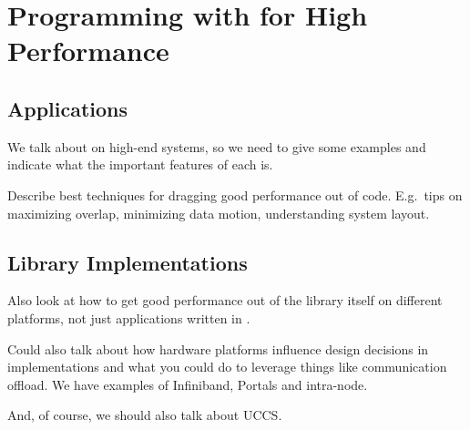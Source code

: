 %
% 
% 
% 
% 
% 
% 
%


\chapter{Programming with \openshmem for High Performance}

\section{Applications}

We talk about \openshmem on high-end systems, so we need to give some
examples and indicate what the important features of each is.

Describe best techniques for dragging good performance out of code.
E.g.\ tips on maximizing overlap, minimizing data motion,
understanding system layout.

\section{Library Implementations}

Also look at how to get good performance out of the library itself
on different platforms, not just applications written in \openshmem.

Could also talk about how hardware platforms influence design
decisions in \openshmem implementations and what you could do to
leverage things like communication offload.  We have examples of
Infiniband, Portals and intra-node.

And, of course, we should also talk about UCCS.
